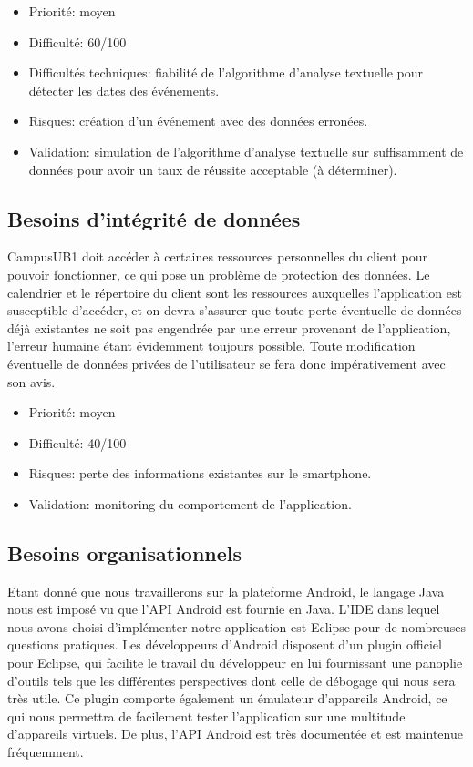 \begin{itemize}
\renewcommand{\labelitemi}{$\bullet$}
\item Priorité: moyen
\item Difficulté: 60/100
\item Difficultés techniques: fiabilité de l'algorithme d'analyse textuelle pour détecter les dates des événements.
\item Risques: création d'un événement avec des données erronées.
\item Validation: simulation de l'algorithme d'analyse textuelle sur suffisamment de données pour avoir un taux de réussite acceptable (à déterminer).
\end{itemize}  

\subsection{Besoins d'intégrité de données}
CampusUB1 doit accéder à certaines ressources personnelles du client pour pouvoir fonctionner, ce qui pose un problème de protection des données. Le calendrier et le répertoire du client sont les ressources auxquelles l'application est susceptible d'accéder, et on devra s'assurer que toute perte éventuelle de données déjà existantes ne soit pas engendrée par une erreur provenant de l'application, l'erreur humaine étant évidemment toujours possible. Toute modification éventuelle de données privées de l'utilisateur se fera donc impérativement avec son avis. \\

\begin{itemize}
\renewcommand{\labelitemi}{$\bullet$}
\item Priorité: moyen
\item Difficulté: 40/100
\item Risques: perte des informations existantes sur le smartphone.
\item Validation: monitoring du comportement de l'application.
\end{itemize} 


\subsection{Besoins organisationnels}
Etant donné que nous travaillerons sur la plateforme Android, le langage Java nous est imposé vu que l'API Android est fournie en Java.
L'IDE dans lequel nous avons choisi d'implémenter notre application est Eclipse pour de nombreuses questions pratiques. Les développeurs d'Android disposent d'un plugin officiel pour Eclipse, qui facilite le travail du développeur en lui fournissant une panoplie d'outils tels que les différentes perspectives dont celle de débogage qui nous sera très utile. Ce plugin comporte également un émulateur d'appareils Android, ce qui nous permettra de facilement tester l'application sur une multitude d'appareils virtuels. De plus, l'API Android est très documentée et est maintenue fréquemment.
